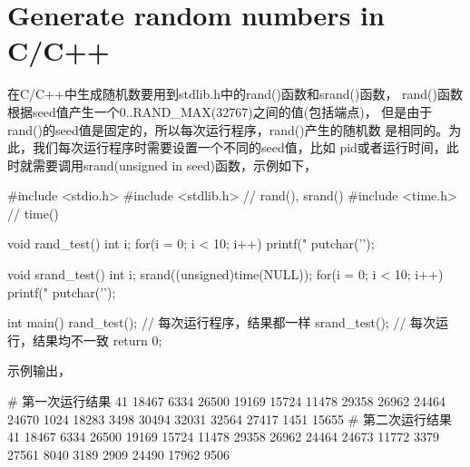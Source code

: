 ﻿\section[Generate random numbers in C/C++]{Generate random numbers in C/C++}
在C/C++中生成随机数要用到stdlib.h中的rand()函数和srand()函数，
rand()函数根据seed值产生一个0..RAND\_MAX(32767)之间的值(包括端点)，
但是由于rand()的seed值是固定的，所以每次运行程序，rand()产生的随机数
是相同的。为此，我们每次运行程序时需要设置一个不同的seed值，比如
pid或者运行时间，此时就需要调用srand(unsigned in seed)函数，示例如下，

\begin{cppcode}
#include <stdio.h>
#include <stdlib.h> // rand(), srand()
#include <time.h>   // time()

void rand_test() {
  int i;
  for(i = 0; i < 10; i++)
    printf(" %
  putchar('\n');
}

void srand_test() {
  int i;
  srand((unsigned)time(NULL));
  for(i = 0; i < 10; i++)
    printf(" %
  putchar('\n');
}

int main()
{
    rand_test(); // 每次运行程序，结果都一样
    srand_test(); // 每次运行，结果均不一致
    return 0;
}
\end{cppcode}

示例输出，

\begin{bashcode}
# 第一次运行结果
 41  18467  6334  26500  19169  15724  11478  29358  26962  24464
 24670  1024  18283  3498  30494  32031  32564  27417  1451  15655
# 第二次运行结果
 41  18467  6334  26500  19169  15724  11478  29358  26962  24464
 24673  11772  3379  27561  8040  3189  2909  24490  17962  9506
\end{bashcode}